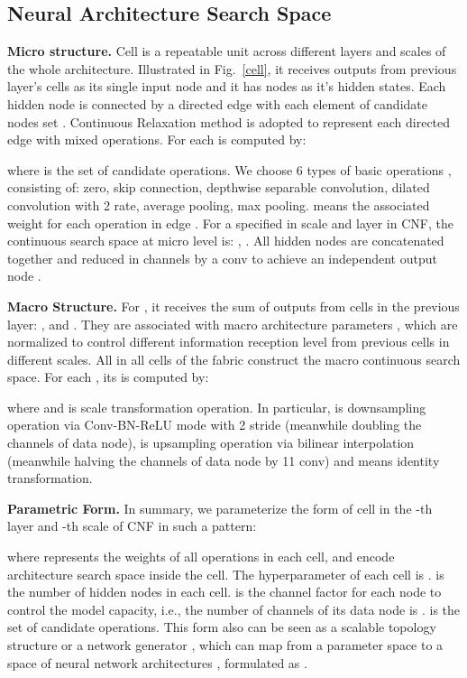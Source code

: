\documentclass[journal]{IEEEtran}
\begin{document}
\subsection{Neural Architecture Search Space}

\label{arch}
\textbf{Micro structure.} Cell is a repeatable unit across different layers and scales of the whole architecture. Illustrated in Fig.~\ref{cell}, it receives outputs from previous layer's cells as its single input node  and it has  nodes as it's hidden states. Each hidden node  is connected by a directed edge with each element of candidate nodes set  . Continuous Relaxation \cite{liu2018darts} method is adopted to represent each directed edge with mixed operations. For each  is computed by:

where  is the set of candidate operations. We choose 6 types of basic operations , consisting of: zero, skip connection,  depthwise separable convolution,  dilated convolution with 2 rate,  average pooling,  max pooling.  means the associated weight for each operation  in edge . For a specified  in scale  and layer  in CNF, the continuous search space at micro level is: , . All hidden nodes  are concatenated together and reduced in channels by a  conv to achieve an independent output node . 



\textbf{Macro Structure.} For , it receives the sum of outputs from cells in the previous layer:  ,  and . They are associated with macro architecture parameters , which are normalized to control different information reception level from previous cells in different scales. All  in all cells of the fabric construct the macro continuous search space. For each , its  is computed by:

where  and  is scale transformation operation. In particular,  is downsampling operation via Conv-BN-ReLU mode with 2 stride (meanwhile doubling the channels of data node),  is upsampling operation via bilinear interpolation (meanwhile halving the channels of data node by 11 conv) and  means identity transformation. 



\textbf{Parametric Form.} In summary, we parameterize the form of cell in the -th layer and -th scale of CNF in such a pattern:

where  represents the weights of all operations in each cell,  and  encode architecture search space inside the cell. The hyperparameter of each cell is .  is the number of hidden nodes in each cell.  is the channel factor for each node to control the model capacity, i.e., the number of channels of its data node is .  is the set of candidate operations. This form also can be seen as a scalable topology structure or a network generator \cite{Xie_2019_ICCV}, which can map from a parameter space  to a space of neural network architectures , formulated as .
\end{document}
